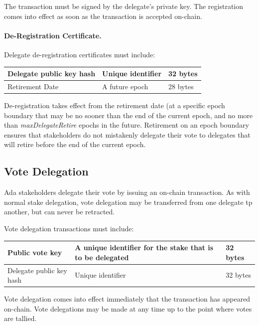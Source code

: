 The transaction must be signed by the delegate's private key.  The registration comes into effect as soon as the transaction is accepted on-chain.

\paragraph{De-Registration Certificate.} Delegate de-registration certificates must include:

\begin{tabular}{||l|p{3in}|l||}
  \hline\hline
  Delegate public key hash & Unique identifier & 32 bytes
  \\\hline
  Retirement Date & A future epoch & 28 bytes
  \\\hline
  \hline
\end{tabular}

De-registration takes effect from the retirement date (at a specific epoch boundary that may be no sooner than the end of the current epoch, and no more than \emph{maxDelegateRetire} epochs in the future.  Retirement on an epoch boundary ensures that stakeholders do not mistakenly delegate their vote to delegates that will retire before the end of the current epoch.

\subsection{Vote Delegation}

Ada stakeholders delegate their vote by issuing an on-chain transaction.  As with normal stake delegation, vote delegation may be transferred from one delegate tp another, but can never be retracted.

Vote delegation transactions must include:

\begin{tabular}{||l|p{3in}|l||}
  \hline\hline
  Public vote key & A unique identifier for the stake that is to be delegated  & 32 bytes
  \\\hline
  Delegate public key hash & Unique identifier & 32 bytes
  \\\hline
  \hline
\end{tabular}

Vote delegation comes into effect immediately that the transaction has appeared on-chain.  %
Vote delegations may be made at any time up to the point where votes are tallied.

